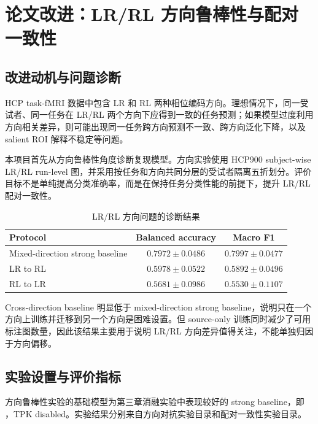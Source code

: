 \chapter{论文改进：LR/RL 方向鲁棒性与配对一致性}

\section{改进动机与问题诊断}

HCP task-fMRI 数据中包含 LR 和 RL 两种相位编码方向。理想情况下，同一受试者、同一任务在 LR/RL 两个方向下应得到一致的任务预测；如果模型过度利用方向相关差异，则可能出现同一任务跨方向预测不一致、跨方向泛化下降，以及 salient ROI 解释不稳定等问题。

本项目首先从方向鲁棒性角度诊断复现模型。方向实验使用 HCP900 subject-wise LR/RL run-level 图，并采用按任务和方向共同分层的受试者隔离五折划分。评价目标不是单纯提高分类准确率，而是在保持任务分类性能的前提下，提升 LR/RL 配对一致性。

\begin{table}[H]
  \centering
  \caption{LR/RL 方向问题的诊断结果}
  \begin{tabular}{lcc}
    \toprule
    Protocol & Balanced accuracy & Macro F1 \\
    \midrule
    Mixed-direction strong baseline & $0.7972 \pm 0.0486$ & $0.7997 \pm 0.0477$ \\
    LR to RL & $0.5978 \pm 0.0522$ & $0.5892 \pm 0.0496$ \\
    RL to LR & $0.5681 \pm 0.0986$ & $0.5530 \pm 0.1107$ \\
    \bottomrule
  \end{tabular}
\end{table}

Cross-direction baseline 明显低于 mixed-direction strong baseline，说明只在一个方向上训练并迁移到另一个方向是困难设置。但 source-only 训练同时减少了可用标注图数量，因此该结果主要用于说明 LR/RL 方向差异值得关注，不能单独归因于方向偏移。

\section{实验设置与评价指标}

方向鲁棒性实验的基础模型为第三章消融实验中表现较好的 strong baseline，即 ，TPK disabled。实验结果分别来自方向对抗实验目录和配对一致性实验目录。


